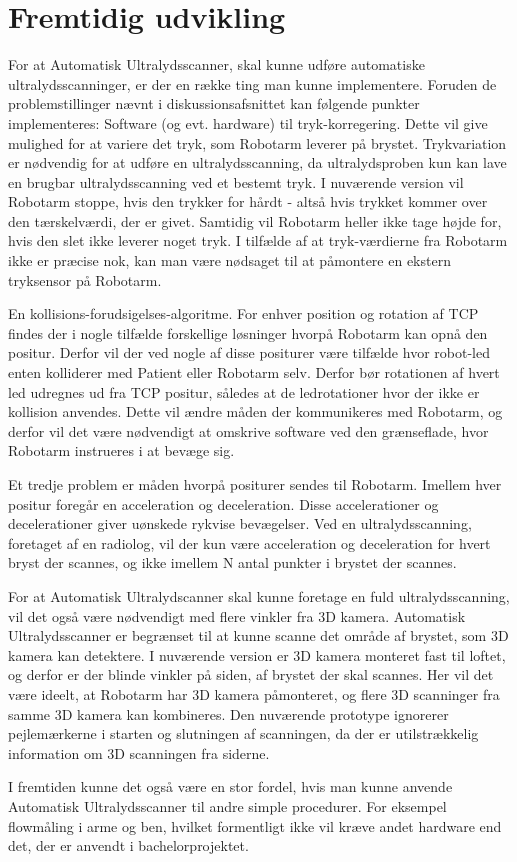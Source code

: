 \chapter{Fremtidig udvikling}\label{kapitel_Fremtidig udvikling}
For at Automatisk Ultralydsscanner, skal kunne udføre automatiske ultralydsscanninger, er der en række ting man kunne implementere. Foruden de problemstillinger nævnt i diskussionsafsnittet kan følgende punkter implementeres:
Software (og evt. hardware) til tryk-korregering. Dette vil give mulighed for at variere det tryk, som Robotarm leverer på brystet. Trykvariation er nødvendig for at udføre en ultralydsscanning, da ultralydsproben kun kan lave en brugbar ultralydsscanning ved et bestemt tryk. I nuværende version vil Robotarm stoppe, hvis den trykker for hårdt - altså hvis trykket kommer over den tærskelværdi, der er givet. Samtidig vil Robotarm heller ikke tage højde for, hvis den slet ikke leverer noget tryk. I tilfælde af at tryk-værdierne fra Robotarm ikke er præcise nok, kan man være nødsaget til at påmontere en ekstern tryksensor på Robotarm.

En kollisions-forudsigelses-algoritme. For enhver position og rotation af TCP findes der i nogle tilfælde forskellige løsninger hvorpå Robotarm kan opnå den positur. Derfor vil der ved nogle af disse positurer være tilfælde hvor robot-led enten kolliderer med Patient eller Robotarm selv. Derfor bør rotationen af hvert led udregnes ud fra TCP positur, således at de ledrotationer hvor der ikke er kollision anvendes. Dette vil ændre måden der kommunikeres med Robotarm, og derfor vil det være nødvendigt at omskrive software ved den grænseflade, hvor Robotarm instrueres i at bevæge sig.

Et tredje problem er måden hvorpå positurer sendes til Robotarm. Imellem hver positur foregår en acceleration og deceleration. Disse accelerationer og decelerationer giver uønskede rykvise bevægelser. Ved en ultralydsscanning, foretaget af en radiolog, vil der kun være acceleration og deceleration for hvert bryst der scannes, og ikke imellem N antal punkter i brystet der scannes.

For at Automatisk Ultralydscanner skal kunne foretage en fuld ultralydsscanning, vil det også være nødvendigt med flere vinkler fra 3D kamera. Automatisk Ultralydsscanner er begrænset til at kunne scanne det område af brystet, som 3D kamera kan detektere. I nuværende version er 3D kamera monteret fast til loftet, og derfor er der blinde vinkler på siden, af brystet der skal scannes. Her vil det være ideelt, at Robotarm har 3D kamera påmonteret, og flere 3D scanninger fra samme 3D kamera kan kombineres. Den nuværende prototype ignorerer pejlemærkerne i starten og slutningen af scanningen, da der er utilstrækkelig information om 3D scanningen fra siderne.

I fremtiden kunne det også være en stor fordel, hvis man kunne anvende Automatisk Ultralydsscanner til andre simple procedurer. For eksempel flowmåling i arme og ben, hvilket formentligt ikke vil kræve andet hardware end det, der er anvendt i bachelorprojektet.